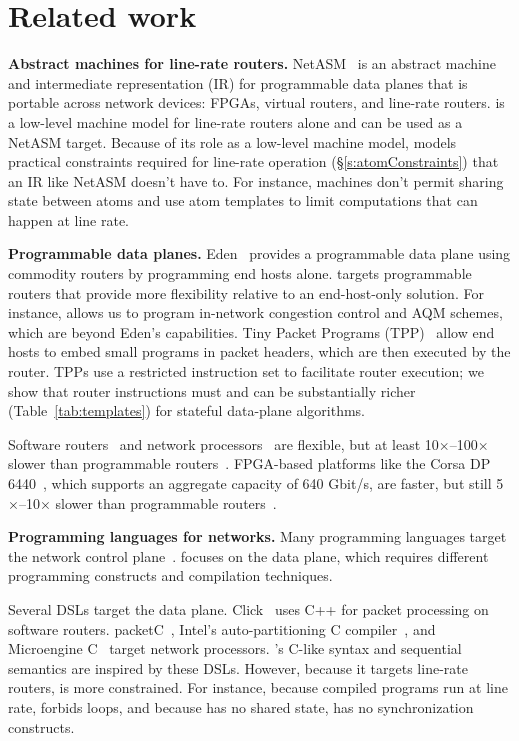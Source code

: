 \section{Related work}
\label{s:related}
\medskip
\noindent
\textbf{Abstract machines for line-rate routers.}
NetASM~\cite{netasm} is an abstract machine and intermediate representation
(IR) for programmable data planes that is portable across network
devices: FPGAs, virtual routers, and line-rate routers.  \absmachine is a
low-level machine model for line-rate routers alone and can be used as a
NetASM target. Because of its role as a low-level machine model, \absmachine
models practical constraints required for line-rate operation (\S\ref{s:atomConstraints}) that an IR like
NetASM doesn't have to. For instance, \absmachine machines don't permit sharing
state between atoms and use atom templates to limit computations that can
happen at line rate.

\medskip
\noindent
\textbf{Programmable data planes.}
Eden~\cite{eden} provides a programmable data plane using commodity routers by
programming end hosts alone. \pktlanguage targets programmable routers that
provide more flexibility relative to an end-host-only solution. For instance,
\pktlanguage allows us to program in-network congestion control and AQM
schemes, which are beyond Eden's capabilities.  Tiny Packet Programs
(TPP)~\cite{tpp} allow end hosts to embed small programs in packet headers,
which are then executed by the router. TPPs use a restricted instruction set to
facilitate router execution; we show that router instructions must and can be
substantially richer (Table~\ref{tab:templates}) for stateful data-plane
algorithms.

Software routers~\cite{routebricks, click} and network processors~\cite{ixp4xx}
are flexible, but at least 10$\times$--100$\times$ slower than programmable
routers~\cite{xpliant, tofino}.  FPGA-based platforms like the Corsa DP
6440~\cite{corsa}, which supports an aggregate capacity of 640 Gbit/s, are
faster, but still 5$\times$--10$\times$ slower than programmable
routers~\cite{tofino, xpliant}.

\medskip
\noindent
\textbf{Programming languages for networks.} Many programming languages target the network control plane~\cite{frenetic, maple}.
\pktlanguage focuses on the data plane, which requires different
programming constructs and compilation techniques.

Several DSLs target the data plane. Click~\cite{click} uses C++ for packet
processing on software routers. packetC~\cite{packetc}, Intel's
auto-partitioning C compiler~\cite{intel_uiuc_pldi}, and Microengine
C~\cite{microenginec} target network processors. \pktlanguage's C-like syntax
and sequential semantics are inspired by these DSLs. However, because it targets
line-rate routers, \pktlanguage is more constrained. For instance, because
compiled programs run at line rate, \pktlanguage forbids loops, and because
\absmachine has no shared state, \pktlanguage has no synchronization constructs.

